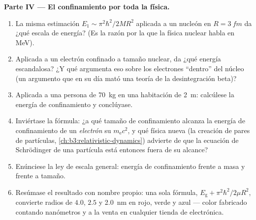 \begin{problem}
\medskip\noindent\textbf{Parte IV --- El confinamiento por toda la física.}
\begin{enumerate}[resume]
  \item La misma estimación $E_1 \sim \pi^2\hbar^2/2MR^2$ aplicada a un
        nucleón en $R = \qty{3}{fm}$ da ¿qué escala de energía? (Es la
        razón por la que la física nuclear habla en MeV).
  \item Aplicada a un electrón confinado a tamaño nuclear, da ¿qué energía
        escandalosa? ¿Y qué argumenta eso sobre los electrones ``dentro''
        del núcleo (un argumento que en su día mató una teoría de la
        desintegración beta)?
  \item Aplicada a una persona de \qty{70}{kg} en una habitación de \qty{2}{m}:
        calcúlese la energía de confinamiento y conclúyase.
  \item Inviértase la fórmula: ¿a qué tamaño de confinamiento alcanza la
        energía de confinamiento de un \emph{electrón} su 
        $m_{\text{e}}c^2$, y qué física nueva (la creación de pares de
        partículas, \cref{ch:b3:relativistic-dynamics}) advierte de que la
        ecuación de Schrödinger de una partícula está entonces fuera de su
        alcance?
  \item Enúnciese la ley de escala general: energía de confinamiento frente a
        masa y frente a tamaño.
  \item Resúmase el resultado con nombre propio: una sola fórmula,
        $E_{\text{g}} + \pi^2\hbar^2/2\mu R^2$, convierte radios de
        $4.0$, $2.5$ y \qty{2.0}{nm} en rojo, verde y azul --- color
        fabricado contando nanómetros y a la venta en cualquier tienda de
        electrónica.
\end{enumerate}
\end{problem}

